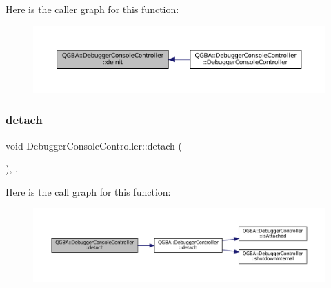 Here is the caller graph for this function\+:
\nopagebreak
\begin{figure}[H]
\begin{center}
\leavevmode
\includegraphics[width=350pt]{class_q_g_b_a_1_1_debugger_console_controller_aeffc611f76eb08424a00f32a0fd7ecda_icgraph}
\end{center}
\end{figure}
\mbox{\label{class_q_g_b_a_1_1_debugger_console_controller_a40c6e05b341d8b27aa4a615129200984}} 
\subsubsection{\texorpdfstring{detach}{detach}}
{\footnotesize\ttfamily void Debugger\+Console\+Controller\+::detach (\begin{DoxyParamCaption}{ }\end{DoxyParamCaption})\hspace{0.3cm}{\ttfamily [override]}, {\ttfamily [virtual]}, {\ttfamily [slot]}}

Here is the call graph for this function\+:
\nopagebreak
\begin{figure}[H]
\begin{center}
\leavevmode
\includegraphics[width=350pt]{class_q_g_b_a_1_1_debugger_console_controller_a40c6e05b341d8b27aa4a615129200984_cgraph}
\end{center}
\end{figure}
\mbox{\label{class_q_g_b_a_1_1_debugger_console_controller_ae81d1d614b8a97913a15d7cf685bc4da}} 
